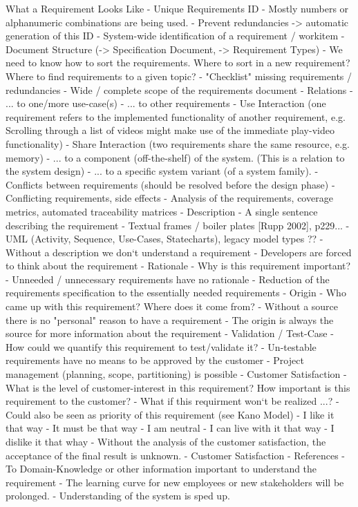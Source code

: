 \documentclass[a4paper]{article}
\begin{document}
\begin{multicols}{3}
  What a Requirement Looks Like
  - Unique Requirements ID
      - Mostly numbers or alphanumeric combinations are being used.
      - Prevent redundancies -> automatic generation of this ID
      - System-wide identification of a requirement / workitem
  - Document Structure (-> Specification Document, -> Requirement Types)
      - We need to know how to sort the requirements. Where to sort in a new requirement? Where to find requirements to a given topic?
      - "Checklist" missing requirements / redundancies
      - Wide / complete scope of the requirements document
  - Relations
      - ... to one/more use-case(s)
      - ... to other requirements
         - Use Interaction (one requirement refers to the implemented functionality of another requirement, e.g. Scrolling through a list of videos might make use of the immediate play-video functionality)
         - Share Interaction (two requirements share the same resource, e.g. memory)
      - ... to a component (off-the-shelf) of the system. (This is a relation to the system design)
      - ... to a specific system variant (of a system family).
      - Conflicts between requirements (should be resolved before the design phase)
      - Conflicting requirements, side effects
      - Analysis of the requirements, coverage metrics, automated traceability matrices
  - Description
      - A single sentence describing the requirement
      - Textual frames / boiler plates [Rupp 2002], p229...
      - UML (Activity, Sequence, Use-Cases, Statecharts), legacy model types ??
      - Without a description we don‘t understand a requirement
      - Developers are forced to think about the requirement
  - Rationale
      - Why is this requirement important?
      - Unneeded / unnecessary requirements have no rationale
      - Reduction of the requirements specification to the essentially needed requirements
  - Origin
      - Who came up with this requirement? Where does it come from?
      - Without a source there is no "personal" reason to have a requirement
      - The origin is always the source for more information about the requirement
  - Validation / Test-Case
      - How could we quantify this requirement to test/validate it?
      - Un-testable requirements have no means to be approved by the customer
      - Project management (planning, scope, partitioning) is possible
  - Customer Satisfaction
      - What is the level of customer-interest in this requirement? How important is this requirement to the customer?
      - What if this requirment won‘t be realized ...?
      - Could also be seen as priority of this requirement (see Kano Model)
         - I like it that way
         - It must be that way
         - I am neutral
         - I can live with it that way
         - I dislike it that whay
      - Without the analysis of the customer satisfaction, the acceptance of the final result is unknown.
      - Customer Satisfaction
  - References
      - To Domain-Knowledge or other information important to understand the requirement
      - The learning curve for new employees or new stakeholders will be prolonged.
      - Understanding of the system is sped up.
  

\end{multicols}
\end{document}
